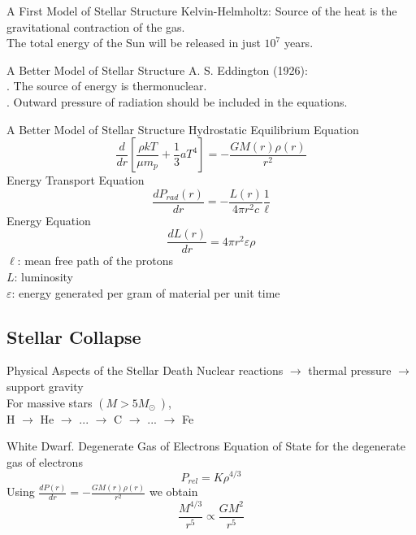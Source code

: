 \documentclass{beamer}
\begin{document}
\begin{frame}{A First Model of Stellar Structure}
	\onslide<1-> Kelvin-Helmholtz: Source of the heat is the gravitational contraction of the gas.\\
     The total energy of the Sun will be released in just $10^7$ years.\\
\end{frame}

\begin{frame}{A Better Model of Stellar Structure}
	\onslide<1-> A. S. Eddington (1926):\\
    . The source of energy is thermonuclear.\\
    . Outward pressure of radiation should be included in the equations.
\end{frame}

\begin{frame}{A Better Model of Stellar Structure}
	\onslide<1-> 
    \footnotesize
    \centering 
    Hydrostatic Equilibrium Equation
    $$\frac{d}{dr} \left[ \frac{\rho k T}{\mu m_p} + \frac{1}{3} a T^4 \right] = -\frac{GM(r)\rho(r)}{r^2}$$
    Energy Transport Equation
    $$\frac{d P_{rad} (r)}{dr} = -\frac{L(r)}{4\pi r^2 c} \frac{1}{\ell}$$
    Energy Equation
    $$\frac{dL(r)}{dr} = 4\pi r^2 \varepsilon \rho$$
    \justify
    $\ell$: mean free path of the protons\\
    $L$: luminosity\\
    $\varepsilon$: energy generated per gram of material per unit time\\
\end{frame}

\subsection{Stellar Collapse}
\begin{frame}{Physical Aspects of the Stellar Death}
	\onslide<1-> 
    Nuclear reactions $\rightarrow$ thermal pressure $\rightarrow$ support gravity \\
    \bigskip
    For massive stars $(M > 5M_\odot\ )$,\\
    H $\rightarrow$ He $\rightarrow$ ... $\rightarrow$ C $\rightarrow$ ... $\rightarrow$ Fe
\end{frame}

\begin{frame}{White Dwarf. Degenerate Gas of Electrons}
	\onslide<1-> Equation of State for the degenerate gas of electrons
    $$P_{rel} = K \rho^{4/3}$$
     Using $\frac{dP(r)}{dr} = -\frac{GM(r)\rho(r)}{r^2}$ we obtain 
    $$\frac{M^{4/3}}{r^5} \propto \frac{GM^2}{r^5} $$
\end{frame}
\end{document}
